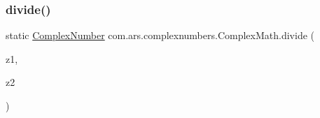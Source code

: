 \subsubsection{\texorpdfstring{divide()}{divide()}\hspace{0.1cm}{\footnotesize\ttfamily [1/2]}}
{\footnotesize\ttfamily static \hyperlink{classcom_1_1ars_1_1complexnumbers_1_1_complex_number}{Complex\+Number} com.\+ars.\+complexnumbers.\+Complex\+Math.\+divide (\begin{DoxyParamCaption}\item[{\hyperlink{classcom_1_1ars_1_1complexnumbers_1_1_complex_number}{Complex\+Number}}]{z1,  }\item[{\hyperlink{classcom_1_1ars_1_1complexnumbers_1_1_complex_number}{Complex\+Number}}]{z2 }\end{DoxyParamCaption})\hspace{0.3cm}{\ttfamily [static]}}


